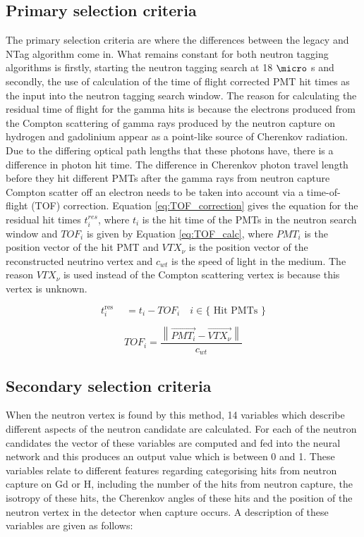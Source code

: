 \subsection{Primary selection criteria}

The primary selection criteria are where the differences between the legacy and NTag algorithm come in. What remains constant for both neutron tagging algorithms is firstly, starting the neutron tagging search at 18 $\micro$ s and secondly, the use of calculation of the time of flight corrected PMT hit times as the input into the neutron tagging search window. The reason for calculating the residual time of flight for the gamma hits is because the electrons produced from the Compton scattering of gamma rays produced by the neutron capture on hydrogen and gadolinium appear as a point-like source of Cherenkov radiation. Due to the differing optical path lengths that these photons have, there is a difference in photon hit time. The difference in Cherenkov photon travel length before they hit different PMTs  after the gamma rays from neutron capture Compton scatter off an electron needs to be taken into account via a time-of-flight (TOF) correction. Equation \ref{eq:TOF_correction} gives the equation for the residual hit times $t_{i}^{res}$, where $t_{i}$ is the hit time of the PMTs in the neutron search window and $TOF_{i}$ is given by Equation \ref{eq:TOF_calc}, where $PMT_{i}$ is the position vector of the hit PMT and $VTX_{\nu}$ is the position vector of the reconstructed neutrino vertex and $c_{wt}$ is the speed of light in the medium. The reason $VTX_{\nu}$ is used instead of the Compton scattering vertex is because this vertex is unknown. 

\begin{equation}
    t_i^{\text {res }} \quad=t_i-T O F_i \quad i \in\{\text { Hit PMTs }\}
    \label{eq:TOF_correction}
\end{equation}

\begin{equation}
T O F_i=\frac{\left\|\overrightarrow{P M T_i}-\overrightarrow{V T X_\nu}\right\|}{c_{w t}}
\label{eq:TOF_calc}
\end{equation}



\subsection{Secondary selection criteria}
When the neutron vertex is found by this method, 14 variables which describe different aspects of the neutron candidate are calculated. For each of the neutron candidates the vector of these variables are computed and fed into the neural network and this produces an output value which is between 0 and 1. These variables relate to different features regarding categorising hits from neutron capture on Gd or H, including the number of the hits from neutron capture, the isotropy of these hits, the Cherenkov angles of these hits and the position of the neutron vertex in the detector when capture occurs. A description of these variables are given as follows:


